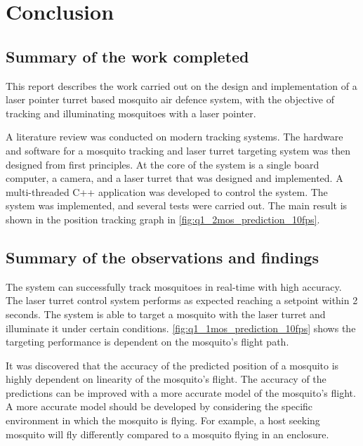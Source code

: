 
\section{Conclusion}

\subsection{Summary of the work completed}
This report describes the work carried out on the design and implementation of a laser pointer turret based mosquito air defence system, with the objective of tracking and illuminating mosquitoes with a laser pointer.

A literature review was conducted on modern tracking systems. The hardware and software for a mosquito tracking and laser turret targeting system was then designed from first principles. At the core of the system is a single board computer, a camera, and a laser turret that was designed and implemented. A multi-threaded C++ application was developed to control the system. The system was implemented, and several tests were carried out. The main result is shown in the position tracking graph in \autoref{fig:q1_2mos_prediction_10fps}.

\subsection{Summary of the observations and findings}
The system can successfully track mosquitoes in real-time with high accuracy. The laser turret control system performs as expected reaching a setpoint within 2 seconds. The system is able to target a mosquito with the laser turret and illuminate it under certain conditions. \autoref{fig:q1_1mos_prediction_10fps} shows the targeting performance is dependent on the mosquito's flight path.

It was discovered that the accuracy of the predicted position of a mosquito is highly dependent on linearity of the mosquito's flight. The accuracy of the predictions can be improved with a more accurate model of the mosquito's flight. A more accurate model should be developed by considering the specific environment in which the mosquito is flying. For example, a host seeking mosquito will fly differently compared to a mosquito flying in an enclosure.


